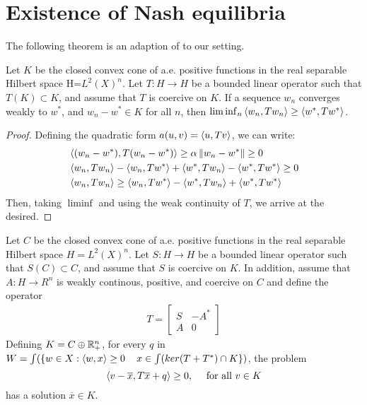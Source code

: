 
\section{Existence of Nash equilibria}
The following theorem is an adaption of \citep[Theorem 3.3]{} to our setting.

\begin{lemma}\label{lem:technical}
	Let $K$ be the closed convex cone of a.e. positive functions in the real separable Hilbert space H=$L^2(X)^n$. Let $T:H \to H$ be a bounded linear operator such that $T(K) \subset K$, and assume that $T$ is coercive on $K$. If a sequence $w_n$ converges weakly to $w^*$, and $w_n - w^* \in K$ for all $n$, then $\liminf_{n} \left \langle w_n,T w_n \right \rangle \geq \left \langle w^*,Tw^* \right \rangle$.
\end{lemma}
\begin{proof}
	Defining the quadratic form $a(u,v)=\left \langle u,Tv \right \rangle$, we can write:
	\begin{align*}
		&\left \langle (w_n-w^*),T(w_n-w^*) \right \rangle \geq \alpha \left \Vert w_n-w^* \right \Vert \geq 0 \\
		&\left \langle w_n,Tw_n \right \rangle-\left \langle w_n,Tw^* \right \rangle+\left \langle w^*,Tw_n \right \rangle - \left \langle w^*,Tw^* \right \rangle \geq 0 \\
		&\left \langle w_n,Tw_n \right \rangle \geq \left \langle w_n,Tw^* \right \rangle-\left \langle w^*,Tw_n \right \rangle +\left \langle w^*,Tw^* \right \rangle
	\end{align*}
	Then, taking $\liminf$ and using the weak continuity of $T$, we arrive at the desired.
\end{proof}
\begin{theorem}
\label{thm:lcp_hilbert}
Let $C$ be the closed convex cone of a.e. positive functions in the real separable Hilbert space $H=L^2(X)^n$.
Let $S:H \to H$ be a bounded linear operator such that $S(C) \subset C$, and assume that $S$ is coercive on $K$. In addition, assume that $A:H \to R^n$ is weakly continous, positive, and coercive on $C$ and define the operator
\begin{align*}
	T = \begin{bmatrix} S & -A^* \\ A & 0 \end{bmatrix}
\end{align*}
Defining $K = C \oplus \mathbb{R}_+^n$, for every $q$ in $W = \int(\{w \in X : \left \langle w,x \right \rangle \geq 0\, \quad x  \in \int(ker(T+T^*) \cap K\})$, the problem
\begin{equation}
	\left \langle v-\overline{x},T\overline{x} + q \right \rangle \geq 0, \quad \text{ for all } v\in K
\end{equation}
has a solution $\overline{x} \in K$.
\end{theorem}

